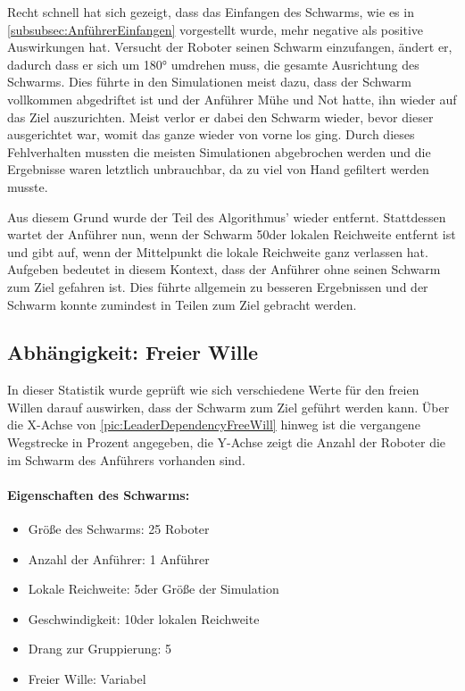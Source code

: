 Recht schnell hat sich gezeigt, dass das Einfangen des Schwarms, wie es in \autoref{subsubsec:AnführerEinfangen} vorgestellt wurde, mehr negative als positive Auswirkungen hat. Versucht der Roboter seinen Schwarm einzufangen, ändert er, dadurch dass er sich um 180° umdrehen muss, die gesamte Ausrichtung des Schwarms. Dies führte in den Simulationen meist dazu, dass der Schwarm vollkommen abgedriftet ist und der Anführer Mühe und Not hatte, ihn wieder auf das Ziel auszurichten. Meist verlor er dabei den Schwarm wieder, bevor dieser ausgerichtet war, womit das ganze wieder von vorne los ging. Durch dieses Fehlverhalten mussten die meisten Simulationen abgebrochen werden und die Ergebnisse waren letztlich unbrauchbar, da zu viel von Hand gefiltert werden musste.

Aus diesem Grund wurde der Teil des Algorithmus' wieder entfernt. Stattdessen wartet der Anführer nun, wenn der Schwarm 50\per der lokalen Reichweite entfernt ist und gibt auf, wenn der Mittelpunkt die lokale Reichweite ganz verlassen hat. Aufgeben bedeutet in diesem Kontext, dass der Anführer ohne seinen Schwarm zum Ziel gefahren ist. Dies führte allgemein zu besseren Ergebnissen und der Schwarm konnte zumindest in Teilen zum Ziel gebracht werden.

\subsection*{Abhängigkeit: Freier Wille}\label{subsubsec:AbhängigkeitFreierWille}

In dieser Statistik wurde geprüft wie sich verschiedene Werte für den freien Willen darauf auswirken, dass der Schwarm zum Ziel geführt werden kann. Über die X-Achse von \autoref{pic:LeaderDependencyFreeWill} hinweg ist die vergangene Wegstrecke in Prozent angegeben, die Y-Achse zeigt die Anzahl der Roboter die im Schwarm des Anführers vorhanden sind.

\paragraph*{Eigenschaften des Schwarms:}
\begin{itemize}
	\item Größe des Schwarms: 25 Roboter
	\item Anzahl der Anführer: 1 Anführer
	\item Lokale Reichweite: 5\per der Größe der Simulation
	\item Geschwindigkeit: 10\per der lokalen Reichweite
	\item Drang zur Gruppierung: 5\per
	\item Freier Wille: Variabel
\end{itemize}

